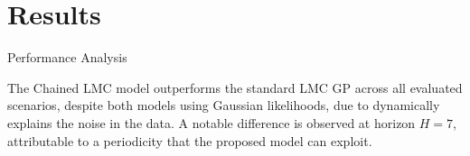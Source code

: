 \section{Results}

\begin{frame}{Performance Analysis}
	
\begin{block}{}
	The Chained LMC model outperforms the standard LMC GP across all evaluated scenarios, despite both models using Gaussian likelihoods, due to dynamically explains the noise in the data. A notable difference is observed at horizon \(H = 7\), attributable to a periodicity that the proposed model can exploit. 
\end{block}	
 
\begin{figure}[htbp]
	\centering
	
\end{figure}

\end{frame}

